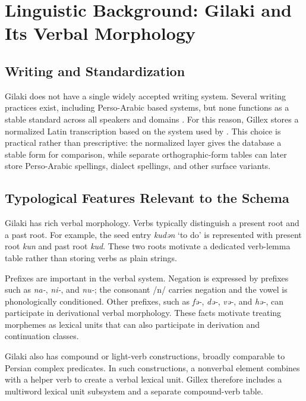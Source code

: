 \documentclass[11pt]{article}
\begin{document}
\section{Linguistic Background: Gilaki and Its Verbal Morphology}

\subsection{Writing and Standardization}

Gilaki does not have a single widely accepted writing system. Several writing practices exist, including Perso-Arabic based systems, but none functions as a stable standard across all speakers and domains \cite{rastorgueva2012gilaki}. For this reason, Gillex stores a normalized Latin transcription based on the system used by \citet{rastorgueva2012gilaki}. This choice is practical rather than prescriptive: the normalized layer gives the database a stable form for comparison, while separate orthographic-form tables can later store Perso-Arabic spellings, dialect spellings, and other surface variants.

\subsection{Typological Features Relevant to the Schema}

Gilaki has rich verbal morphology. Verbs typically distinguish a present root and a past root. For example, the seed entry \textit{kudǝn} `to do' is represented with present root \textit{kun} and past root \textit{kud}. These two roots motivate a dedicated verb-lemma table rather than storing verbs as plain strings.

Prefixes are important in the verbal system. Negation is expressed by prefixes such as \textit{na-}, \textit{ni-}, and \textit{nu-}; the consonant /n/ carries negation and the vowel is phonologically conditioned. Other prefixes, such as \textit{fǝ-}, \textit{dǝ-}, \textit{vǝ-}, and \textit{hǝ-}, can participate in derivational verbal morphology. These facts motivate treating morphemes as lexical units that can also participate in derivation and continuation classes.

Gilaki also has compound or light-verb constructions, broadly comparable to Persian complex predicates. In such constructions, a nonverbal element combines with a helper verb to create a verbal lexical unit. Gillex therefore includes a multiword lexical unit subsystem and a separate compound-verb table.
\end{document}
